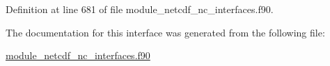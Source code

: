 Definition at line 681 of file module\+\_\+netcdf\+\_\+nc\+\_\+interfaces.\+f90.



The documentation for this interface was generated from the following file\+:\begin{DoxyCompactItemize}
\item 
\hyperlink{module__netcdf__nc__interfaces_8f90}{module\+\_\+netcdf\+\_\+nc\+\_\+interfaces.\+f90}\end{DoxyCompactItemize}
